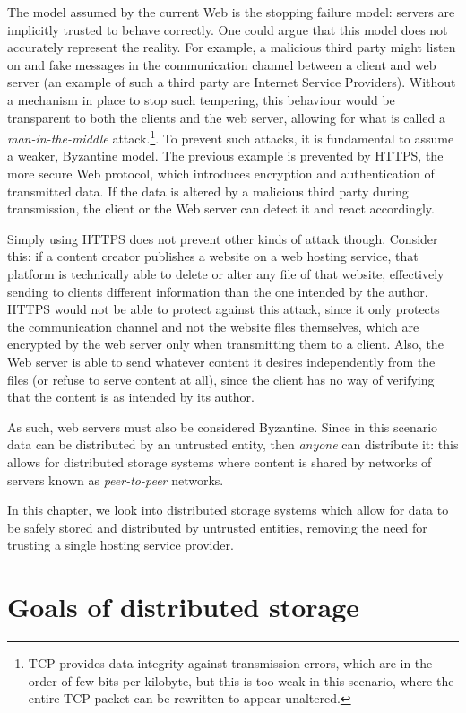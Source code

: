 \documentclass[mscthesis]{usiinfthesis}
\begin{document}
The model assumed by the current Web is the stopping failure model: servers are implicitly trusted to behave correctly.
One could argue that this model does not accurately represent the reality.
For example, a malicious third party might listen on and fake messages in the communication channel between a client and web server (an example of such a third party are Internet Service Providers).
Without a mechanism in place to stop such tempering, this behaviour would be transparent to both the clients and the web server, allowing for what is called a \textit{man-in-the-middle} attack.\footnote{TCP provides data integrity against transmission errors, which are in the order of few bits per kilobyte, but this is too weak in this scenario, where the entire TCP packet can be rewritten to appear unaltered.}.
To prevent such attacks, it is fundamental to assume a weaker, Byzantine model.
The previous example is prevented by HTTPS, the more secure Web protocol, which introduces encryption and authentication of transmitted data.
If the data is altered by a malicious third party during transmission, the client or the Web server can detect it and react accordingly.

Simply using HTTPS does not prevent other kinds of attack though. Consider this: if a content creator publishes a website on a web hosting service, that platform is technically able to delete or alter any file of that website, effectively sending to clients different information than the one intended by the author. HTTPS would not be able to protect against this attack, since it only protects the communication channel and not the website files themselves, which are encrypted by the web server only when transmitting them to a client. Also, the Web server is able to send whatever content it desires independently from the files (or refuse to serve content at all), since the client has no way of verifying that the content is as intended by its author.

As such, web servers must also be considered Byzantine. Since in this scenario data can be distributed by an untrusted entity, then \emph{anyone} can distribute it: this allows for distributed storage systems where content is shared by networks of servers known as \emph{peer-to-peer} networks.

In this chapter, we look into distributed storage systems which allow for data to be safely stored and distributed by untrusted entities, removing the need for trusting a single hosting service provider.

\section{Goals of distributed storage}
\end{document}
